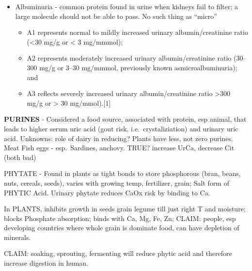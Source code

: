 \begin{itemize}
\item
  Albuminuria - common protein found in urine when kidneys fail to
  filter; a large molecule should not be able to pass. No such thing as
  ``micro''

  \begin{itemize}
  \item
    A1 represents normal to mildly increased urinary albumin/creatinine
    ratio (\textless30 mg/g or \textless{} 3 mg/mmmol);
  \item
    A2 represents moderately increased urinary albumin/creatinine ratio
    (30--300 mg/g or 3--30 mg/mmmol, previously known
    asmicroalbuminuria); and
  \item
    A3 reflects severely increased urinary albumin/creatinine ratio
    \textgreater300 mg/g or \textgreater{} 30 mg/mmol).{[}1{]}
  \end{itemize}
\end{itemize}

\textbf{PURINES} - Considered a food source, associated with protein,
esp animal, that leads to higher serum uric acid (gout risk,
i.e.~crystaliziation) and urinary uric acid. Unknowns: role of dairy in
reducing? Plants have less, not zero purines. Meat \textbar{} Fish
\textbar{} eggs - esp.~Sardines, anchovy. TRUE? increase UrCa, decrease
Cit (both bad)

PHYTATE - Found in plants as tight bonds to store phosphorous (bran,
beans, nuts, cereals, seeds), varies with growing temp, fertilizer,
grain; Salt form of PHYTIC Acid. Urinary phytate reduces CaOx risk by
binding to Ca.

In PLANTS, inhibits growth in seeds grain legume till just right T and
moisture; blocks Phosphate absorption; binds with Ca, Mg, Fe, Zn; CLAIM:
people, esp developing countries where whole grain is dominate food, can
have depletion of minerals.

CLAIM: soaking, sprouting, fermenting will reduce phytic acid and
therefore increase digestion in human.

